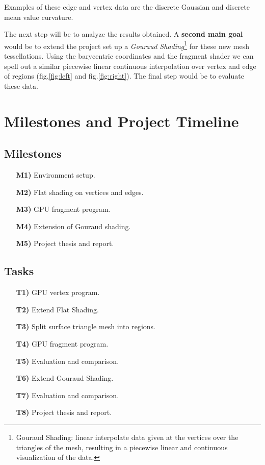 \documentclass[11pt]{article}
\begin{document}
Examples of these edge and vertex data are the discrete Gaussian and discrete mean value curvature.

The next step will be to analyze the results obtained. A \textbf{second main goal} would be to extend the project set up a \textit{Gouraud Shading}\footnote{Gouraud Shading: linear interpolate data given at the vertices over the triangles of the mesh, resulting in a piecewise linear and continuous visualization of the data.}
for these new mesh tessellations. Using the barycentric coordinates and the fragment shader we can spell out a similar piecewise linear continuous interpolation over vertex and edge of regions (fig.\ref{fig:left} and fig.\ref{fig:right}).
The final step would be to evaluate these data.

\section{Milestones and Project Timeline} 
\subsection{Milestones}
\begin{itemize}
\item [\textbf{M1)}] Environment setup.
\item [\textbf{M2)}] Flat shading on vertices and edges.
\item [\textbf{M3)}] GPU fragment program.
\item [\textbf{M4)}] Extension of Gouraud shading.
\item [\textbf{M5)}] Project thesis and report.
\end{itemize}

\subsection{Tasks}
\begin{itemize}
  \item [\textbf{T1)}] GPU vertex program.
  \item [\textbf{T2)}] Extend Flat Shading.
  \item [\textbf{T3)}] Split surface triangle mesh into regions.
  \item [\textbf{T4)}] GPU fragment program.
  \item [\textbf{T5)}] Evaluation and comparison.
  \item [\textbf{T6)}] Extend Gouraud Shading.
  \item [\textbf{T7)}] Evaluation and comparison.
  \item [\textbf{T8)}] Project thesis and report.
  \end{itemize}
\end{document}
